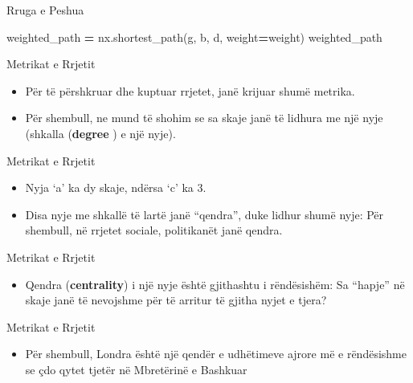 \documentclass[
  ignorenonframetext,
]{beamer}
\newenvironment{Shaded}{\begin{snugshade}}{\end{snugshade}}
\newcommand{\NormalTok}[1]{#1}
\newcommand{\OperatorTok}[1]{\textcolor[rgb]{0.81,0.36,0.00}{\textbf{#1}}}
\newcommand{\StringTok}[1]{\textcolor[rgb]{0.31,0.60,0.02}{#1}}
\providecommand{\tightlist}{%
  \setlength{\itemsep}{0pt}\setlength{\parskip}{0pt}}
\begin{document}
\begin{frame}[fragile]{Rruga e Peshua}
\protect\hypertarget{rruga-e-peshua}{}

\begin{Shaded}
\begin{Highlighting}[]
\NormalTok{weighted\_path }\OperatorTok{=}\NormalTok{ nx.shortest\_path(g, }\StringTok{\textquotesingle{}b\textquotesingle{}}\NormalTok{, }\StringTok{\textquotesingle{}d\textquotesingle{}}\NormalTok{, weight}\OperatorTok{=}\StringTok{\textquotesingle{}weight\textquotesingle{}}\NormalTok{)}
\NormalTok{weighted\_path}
\end{Highlighting}
\end{Shaded}
\end{frame}

\begin{frame}{Metrikat e Rrjetit}
\protect\hypertarget{metrikat-e-rrjetit}{}
\begin{itemize}
\item
  Për të përshkruar dhe kuptuar rrjetet, janë krijuar shumë metrika.
\item
  Për shembull, ne mund të shohim se sa skaje janë të lidhura me një
  nyje (shkalla (\textbf{degree }) e një nyje).
\end{itemize}
\end{frame}

\begin{frame}{Metrikat e Rrjetit}
\protect\hypertarget{metrikat-e-rrjetit-1}{}
\begin{itemize}
\item
  Nyja `a' ka dy skaje, ndërsa `c' ka 3.
\item
  Disa nyje me shkallë të lartë janë ``qendra'', duke lidhur shumë nyje:
  Për shembull, në rrjetet sociale, politikanët janë qendra.
\end{itemize}
\end{frame}

\begin{frame}{Metrikat e Rrjetit}
\protect\hypertarget{metrikat-e-rrjetit-2}{}
\begin{itemize}
\tightlist
\item
  Qendra (\textbf{centrality}) i një nyje është gjithashtu i
  rëndësishëm: Sa ``hapje'' në skaje janë të nevojshme për të arritur të
  gjitha nyjet e tjera?
\end{itemize}
\end{frame}

\begin{frame}{Metrikat e Rrjetit}
\protect\hypertarget{metrikat-e-rrjetit-3}{}
\begin{itemize}
\tightlist
\item
  Për shembull, Londra është një qendër e udhëtimeve ajrore më e
  rëndësishme se çdo qytet tjetër në Mbretërinë e Bashkuar
\end{itemize}
\end{frame}
\end{document}
